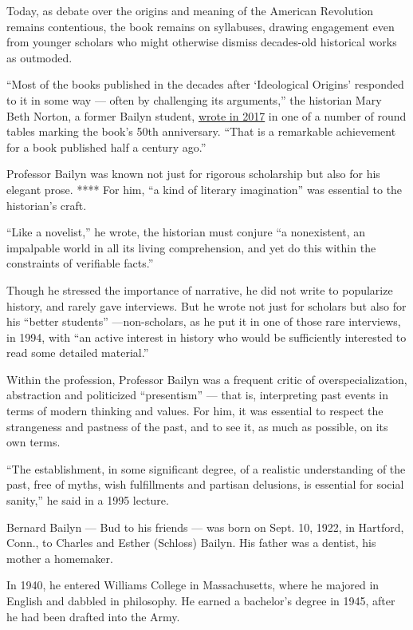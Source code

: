 Today, as debate over the origins and meaning of the American Revolution
remains contentious, the book remains on syllabuses, drawing engagement
even from younger scholars who might otherwise dismiss decades-old
historical works as outmoded.

``Most of the books published in the decades after `Ideological Origins'
responded to it in some way --- often by challenging its arguments,''
the historian Mary Beth Norton, a former Bailyn student,
\href{https://harvardpress.typepad.com/hup_publicity/2017/04/bernard-bailyns-ideological-origins-at-fifty.html\#norton}{wrote
in 2017} in one of a number of round tables marking the book's 50th
anniversary. ``That is a remarkable achievement for a book published
half a century ago.''

Professor Bailyn was known not just for rigorous scholarship but also
for his elegant prose. **** For him, ``a kind of literary imagination''
was essential to the historian's craft.

``Like a novelist,'' he wrote, the historian must conjure ``a
nonexistent, an impalpable world in all its living comprehension, and
yet do this within the constraints of verifiable facts.''

Though he stressed the importance of narrative, he did not write to
popularize history, and rarely gave interviews. But he wrote not just
for scholars but also for his ``better students'' ---non-scholars, as he
put it in one of those rare interviews, in 1994, with ``an active
interest in history who would be sufficiently interested to read some
detailed material.''

Within the profession, Professor Bailyn was a frequent critic of
overspecialization, abstraction and politicized ``presentism'' --- that
is, interpreting past events in terms of modern thinking and values. For
him, it was essential to respect the strangeness and pastness of the
past, and to see it, as much as possible, on its own terms.

``The establishment, in some significant degree, of a realistic
understanding of the past, free of myths, wish fulfillments and partisan
delusions, is essential for social sanity,'' he said in a 1995 lecture.

Bernard Bailyn --- Bud to his friends --- was born on Sept. 10, 1922, in
Hartford, Conn., to Charles and Esther (Schloss) Bailyn. His father was
a dentist, his mother a homemaker.

In 1940, he entered Williams College in Massachusetts, where he majored
in English and dabbled in philosophy. He earned a bachelor's degree in
1945, after he had been drafted into the Army.

